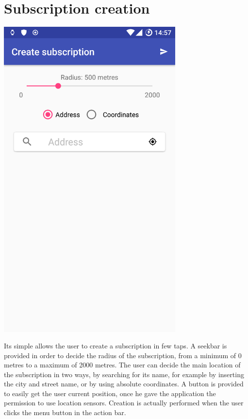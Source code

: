 \documentclass[a4paper]{scrreprt}
\begin{document}
\section{Subscription creation}
\begin{minipage}{0.5\textwidth}
	\centering
	\includegraphics[width=0.7\textwidth]{subscription_create}
\end{minipage}
\begin{minipage}{0.5\textwidth}
	Its simple allows the user to create a subscription in few taps. A seekbar is provided in order to decide the radius of the subscription, from a minimum of 0 metres to a maximum of 2000 metres. The user can decide the main location of the subscription in two ways, by searching for its name, for example by inserting the city and street name, or by using absolute coordinates. A button is provided to easily get the user current position, once he gave the application the permission to use location sensors. Creation is actually performed when the user clicks the menu button in the action bar.
\end{minipage}
\end{document}
